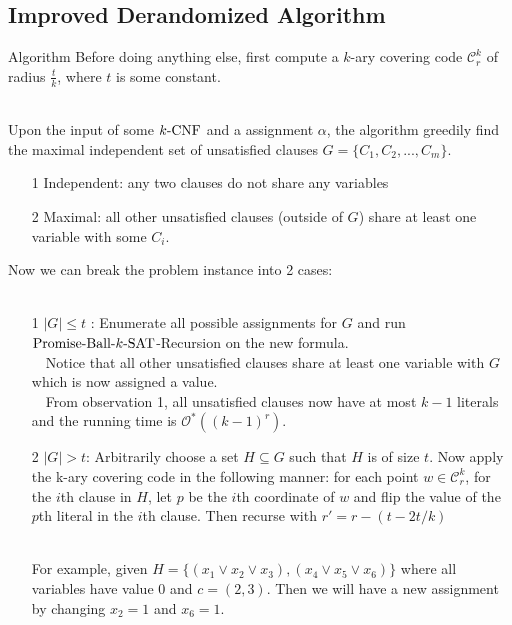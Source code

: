 \documentclass[pdf] {beamer}
\newcommand{\SAT}{\textnormal{$k$-SAT}}
\newcommand{\CNF}{\textnormal{$k$-CNF}}
\newcommand{\PBS}{\textnormal{Promise-Ball-$\SAT$}}
\newcommand{\cc}{\mathcal{C}}
\renewcommand{\O}{\mathcal{O}^*}
\begin{document}
	\subsection{Improved Derandomized Algorithm}
	\begin{frame}{Algorithm}
	Before doing anything else, first compute a $k$-ary covering code $\cc_r^k$ of radius $\frac{t}{k}$, where $t$ is some constant. \\~\
	
	Upon the input of some $\CNF$ and a assignment $\alpha$, the algorithm greedily find the maximal independent set of unsatisfied clauses $G = \{C_1, C_2, ...,C_m\}$. \\
	\begin{enumerate}
		\item[1] Independent: any two clauses do not share any variables\\
		\item[2] Maximal: all other unsatisfied clauses (outside of $G$) share at least one variable with some $C_i$.
	\end{enumerate}
	Now we can break the problem instance into 2 cases: \\~\
	\end{frame}
	\begin{frame}
		\begin{enumerate}
			\item[1] $|G| \leq t$ : Enumerate all possible assignments for $G$ and run $\PBS$-Recursion on the new formula. \\~\
			Notice that all other unsatisfied clauses share at least one variable with $G$ which is now assigned a value. \\~\
			From observation 1, all unsatisfied clauses now have at most $k-1$ literals and the running time is $\O((k-1)^r)$.
		\end{enumerate}
	\end{frame}	
	\begin{frame}
		\begin{enumerate}
			\item[2] $|G| > t$: Arbitrarily choose a set $H \subseteq G$ such that $H$ is of size $t$. Now apply the k-ary covering code in the following manner: for each point $w \in \cc_r^k$, for the $i$th clause in $H$, let $p$ be the $i$th coordinate of $w$ and flip the value of the $p$th literal in the $i$th clause. Then recurse with $r' = r - (t - 2t/k)$\\~\
			
			For example, given $H = \{(x_1 \lor x_2 \lor x_3), (x_4 \lor x_5 \lor x_6)\}$ where all variables have value $0$ and $c = (2,3)$. Then we will have a new assignment by changing $x_2 = 1$ and $x_6 = 1$.
		\end{enumerate}
	\end{frame}	
\end{document}
